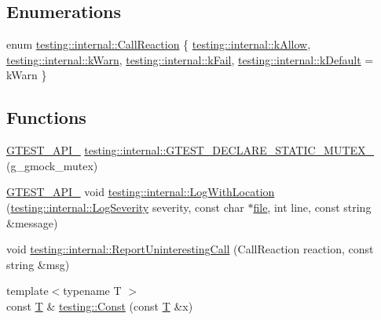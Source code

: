 \subsection*{Enumerations}
\begin{DoxyCompactItemize}
\item 
enum \hyperlink{namespacetesting_1_1internal_adfcd859062983a889f4bd18e6977357e}{testing\+::internal\+::\+Call\+Reaction} \{ \hyperlink{namespacetesting_1_1internal_adfcd859062983a889f4bd18e6977357ea8fb8a836a31364701cd5c07daa8638cb}{testing\+::internal\+::k\+Allow}, 
\hyperlink{namespacetesting_1_1internal_adfcd859062983a889f4bd18e6977357ead61a9c681c751967e19f7abe4640d4a2}{testing\+::internal\+::k\+Warn}, 
\hyperlink{namespacetesting_1_1internal_adfcd859062983a889f4bd18e6977357ea6fc25174a501f31b090a2b556f77fdc1}{testing\+::internal\+::k\+Fail}, 
\hyperlink{namespacetesting_1_1internal_adfcd859062983a889f4bd18e6977357ea8ff660434ddb710d1d588df98ee902fc}{testing\+::internal\+::k\+Default} = k\+Warn
 \}
\end{DoxyCompactItemize}
\subsection*{Functions}
\begin{DoxyCompactItemize}
\item 
\hyperlink{gtest-port_8h_aa73be6f0ba4a7456180a94904ce17790}{G\+T\+E\+S\+T\+\_\+\+A\+P\+I\+\_\+} \hyperlink{namespacetesting_1_1internal_ae4d273e9b76b40a28483826518e68f17}{testing\+::internal\+::\+G\+T\+E\+S\+T\+\_\+\+D\+E\+C\+L\+A\+R\+E\+\_\+\+S\+T\+A\+T\+I\+C\+\_\+\+M\+U\+T\+E\+X\+\_\+} (g\+\_\+gmock\+\_\+mutex)
\item 
\hyperlink{gtest-port_8h_aa73be6f0ba4a7456180a94904ce17790}{G\+T\+E\+S\+T\+\_\+\+A\+P\+I\+\_\+} void \hyperlink{namespacetesting_1_1internal_af271cd1fc0b62a7f4736cb3109e86a37}{testing\+::internal\+::\+Log\+With\+Location} (\hyperlink{namespacetesting_1_1internal_a203d1a8a2147a53d12bbdae40d443914}{testing\+::internal\+::\+Log\+Severity} severity, const char $\ast$\hyperlink{_07copy_08_2_read_camera_model_8m_a151631b2fd2bb776ef06c9f440a7ed74}{file}, int line, const string \&message)
\item 
void \hyperlink{namespacetesting_1_1internal_a8d99a1e87d0cea563b2bfad8a4e65276}{testing\+::internal\+::\+Report\+Uninteresting\+Call} (Call\+Reaction reaction, const string \&msg)
\item 
{\footnotesize template$<$typename T $>$ }\\const \hyperlink{functions__7_8js_adf1f3edb9115acb0a1e04209b7a9937b}{T} \& \hyperlink{namespacetesting_a945ac56c5508a3c9c032bbe8aae8dcfa}{testing\+::\+Const} (const \hyperlink{functions__7_8js_adf1f3edb9115acb0a1e04209b7a9937b}{T} \&x)
\end{DoxyCompactItemize}
